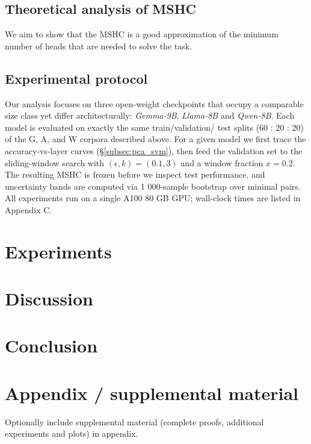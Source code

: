 \documentclass{article}
\begin{document}
\subsection{Theoretical analysis of MSHC}
We aim to show that the MSHC is a good approximation of the minimum number of heads that are needed to solve the task.

\subsection{Experimental protocol}
\label{subsec:protocol}

Our analysis focuses on three open-weight checkpoints that occupy a comparable
size class yet differ architecturally: \emph{Gemma-9B}, \emph{Llama-8B} and
\emph{Qwen-8B}.  Each model is evaluated on exactly the same train/validation/
test splits (60 : 20 : 20) of the G, A, and W corpora described above.  For a
given model we first trace the accuracy‑vs‑layer curves
(§\ref{subsec:pca_svm}), then feed the validation set to the sliding-window
search with $(\epsilon,k)=(0.1,3)$ and a window fraction $x\!=\!0.2$.  The
resulting MSHC is frozen before we inspect test performance, and uncertainty
bands are computed via 1 000-sample bootstrap over minimal pairs.  All
experiments run on a single A100 80 GB GPU; wall-clock times are listed in
Appendix C.
\section{Experiments}

\section{Discussion}

\section{Conclusion}





\appendix
\section{Appendix / supplemental material}

Optionally include supplemental material (complete proofs, additional experiments and plots) in appendix.
\end{document}

